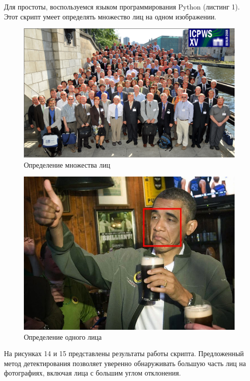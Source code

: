 \documentclass[a4paper, 14pt]{extarticle}	%
\begin{document}
Для простоты, воспользуемся языком программирования Python (листинг 1). Этот скрипт умеет определять множество лиц на одном изображении.



\begin{figure}[h!]
\centering
\includegraphics[scale=0.35]{res/pic014}
\caption{Определение множества лиц}
\end{figure}

\begin{figure}[h!]
\centering
\includegraphics[scale=0.6]{res/pic015}
\caption{Определение одного лица}
\end{figure}

На рисунках 14 и 15 представлены результаты работы скрипта. Предложенный метод детектирования позволяет уверенно обнаруживать большую часть лиц на фотографиях, включая лица с большим углом отклонения.
\end{document}
